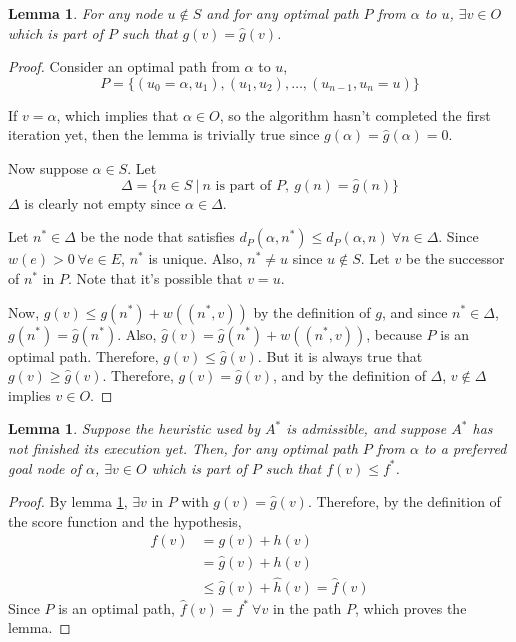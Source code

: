 \documentclass[12pt]{report}
\newtheorem{lemma}[theorem]{Lemma}
\begin{document}
\begin{lemma}
\label{lemma:astar1}
For any node $u \not \in S$ and for any optimal path $P$ from $\alpha$ to $u$, $\exists v \in O$ which is part of $P$ such that $g(v) = \hat{g}(v)$.
\end{lemma}
\begin{proof}
Consider an optimal path from $\alpha$ to $u$,
\[P = \{ (u_0 = \alpha, u_1), (u_1, u_2), \dots, (u_{n-1}, u_n = u) \}\]

If $v = \alpha$, which implies that $\alpha \in O$, so the algorithm hasn't completed the first iteration yet, then the lemma is trivially true since $g(\alpha) = \hat{g}(\alpha) = 0$.

Now suppose $\alpha \in S$. Let
\[ \Delta = \{ n \in S \  | \  n \text{ is part of } P,\  g(n) = \hat{g}(n) \} \]
$\Delta$ is clearly not empty since $\alpha \in \Delta$.

Let $n^* \in \Delta$ be the node that satisfies $d_P(\alpha, n^*) \leq d_P(\alpha, n) \  \forall n \in \Delta$. Since $w(e) > 0\  \forall e \in E$, $n^*$ is unique. Also, $n^* \neq u$ since $u \not \in S$. Let $v$ be the successor of $n^*$ in $P$. Note that it's possible that $v = u$.

Now, $g(v) \leq g(n^*) + w((n^*, v))$ by the definition of $g$, and since $n^* \in \Delta$, $g(n^*) = \hat{g}(n^*)$. Also, $\hat{g}(v) = \hat{g}(n^*) + w((n^*, v))$, because $P$ is an optimal path. Therefore, $g(v) \leq \hat{g}(v)$. But it is always true that $g(v) \geq \hat{g}(v)$. Therefore, $g(v) = \hat{g}(v)$, and by the definition of $\Delta$, $v \not \in \Delta$ implies $v \in O$.
\end{proof}

\begin{lemma}
\label{lemma:astar2}
Suppose the heuristic used by $A^*$ is admissible, and suppose $A^*$ has not finished its execution yet. Then, for any optimal path $P$ from $\alpha$ to a preferred goal node of $\alpha$, $\exists v \in O$ which is part of $P$ such that $f(v) \leq f^*$.
\end{lemma}
\begin{proof}
By lemma \ref{lemma:astar1}, $\exists v$ in $P$ with $g(v) = \hat{g}(v)$. Therefore, by the definition of the score function and the hypothesis,
\begin{align*}
f(v) &= g(v) + h(v)\\
&= \hat{g}(v) + h(v)\\
&\leq \hat{g}(v) + \hat{h}(v) = \hat{f}(v)
\end{align*}
Since $P$ is an optimal path, $\hat{f}(v) = f^* \  \forall v$ in the path $P$, which proves the lemma.
\end{proof}
\end{document}
